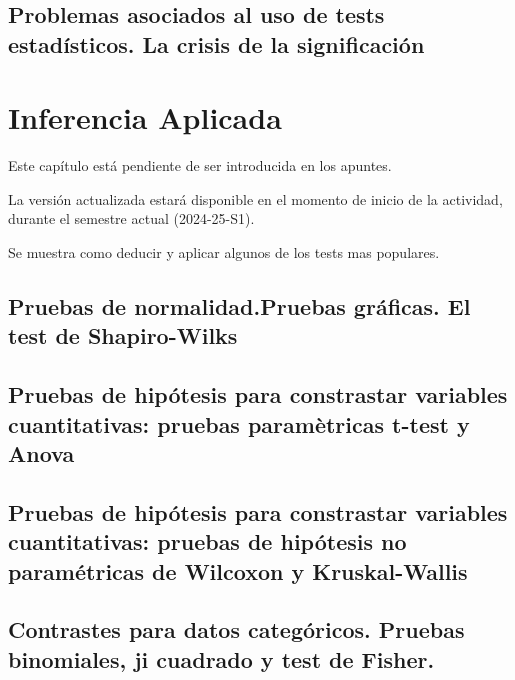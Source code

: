 \documentclass[
]{article}
\begin{document}
\subsection{Problemas asociados al uso de tests estadísticos. La crisis de la significación}\label{problemas-asociados-al-uso-de-tests-estaduxedsticos.-la-crisis-de-la-significaciuxf3n}

\section{Inferencia Aplicada}\label{inferencia-aplicada}

Este capítulo está pendiente de ser introducida en los apuntes.

La versión actualizada estará disponible en el momento de inicio de la actividad, durante el semestre actual (2024-25-S1).

Se muestra como deducir y aplicar algunos de los tests mas populares.

\subsection{Pruebas de normalidad.Pruebas gráficas. El test de Shapiro-Wilks}\label{pruebas-de-normalidad.pruebas-gruxe1ficas.-el-test-de-shapiro-wilks}

\subsection{Pruebas de hipótesis para constrastar variables cuantitativas: pruebas paramètricas t-test y Anova}\label{pruebas-de-hipuxf3tesis-para-constrastar-variables-cuantitativas-pruebas-paramuxe8tricas-t-test-y-anova}

\subsection{Pruebas de hipótesis para constrastar variables cuantitativas: pruebas de hipótesis no paramétricas de Wilcoxon y Kruskal-Wallis}\label{pruebas-de-hipuxf3tesis-para-constrastar-variables-cuantitativas-pruebas-de-hipuxf3tesis-no-paramuxe9tricas-de-wilcoxon-y-kruskal-wallis}

\subsection{Contrastes para datos categóricos. Pruebas binomiales, ji cuadrado y test de Fisher.}\label{contrastes-para-datos-categuxf3ricos.-pruebas-binomiales-ji-cuadrado-y-test-de-fisher.}
\end{document}
